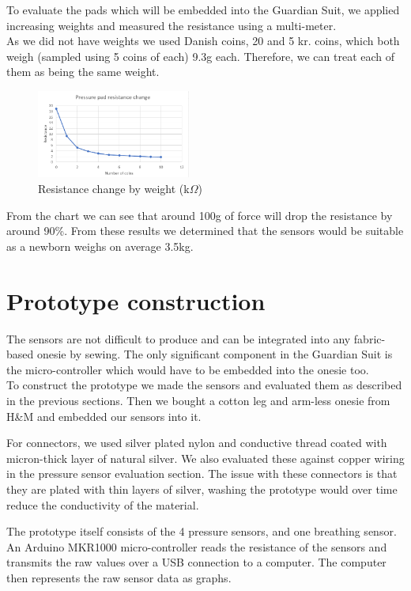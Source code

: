 \documentclass{sigchi-ext}
\begin{document}
To evaluate the pads which will be embedded into the Guardian Suit, we applied 
increasing weights and measured the resistance using a multi-meter.\\
As we did not have weights we used Danish coins, 20 and 5 kr. coins, which both
weigh (sampled using 5 coins of each) 9.3g each. Therefore, we can treat each of them as
being the same weight.
\begin{figure} [H]
   \centering \includegraphics[width=0.45\textwidth]{img/chart.PNG}
    \caption{Resistance change by weight (k$\Omega$)}
\end{figure}
From the chart we can see that around 100g of force will drop the resistance
by around 90\%. From these results we determined that the sensors would be suitable
as a newborn weighs on average 3.5kg.

\clearpage

\section{Prototype construction}
The sensors are not difficult to produce and can be integrated into any fabric-based
onesie by sewing. The only significant component in the Guardian Suit is the
micro-controller which would have to be embedded into the onesie too.\\
To construct the prototype we made the sensors and evaluated them as
described in the previous sections. Then we bought a cotton leg and arm-less
onesie from H\&M and embedded our sensors into it.

For connectors, we used silver plated nylon and conductive thread coated with
micron-thick layer of natural silver. We also evaluated these against copper
wiring in the pressure sensor evaluation section. The issue with these
connectors is that they are plated with thin layers of silver, washing the prototype
would over time reduce the conductivity of the material.

The prototype itself consists of the 4 pressure sensors, and one breathing sensor. 
An Arduino MKR1000 micro-controller reads the resistance of the sensors and transmits the raw values over a USB connection to a computer. The computer then represents the raw sensor data as graphs.
\end{document}

